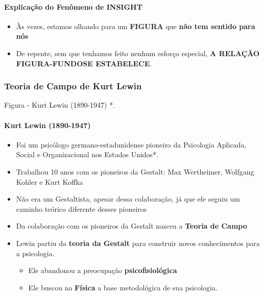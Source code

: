 \documentclass[
]{book}
\providecommand{\tightlist}{%
  \setlength{\itemsep}{0pt}\setlength{\parskip}{0pt}}
\begin{document}
\hypertarget{explicauxe7uxe3o-do-fenuxf4meno-de-insight}{%
\paragraph{Explicação do Fenômeno de
INSIGHT}\label{explicauxe7uxe3o-do-fenuxf4meno-de-insight}}

\begin{itemize}
\tightlist
\item
  Às vezes, estamos olhando para um \textbf{FIGURA} que \textbf{não tem
  sentido para nós}
\item
  De repente, sem que tenhamos feito nenhum esforço especial, \textbf{A
  RELAÇÃO FIGURA-FUNDOSE ESTABELECE}.
\end{itemize}

\hypertarget{teoria-de-campo-de-kurt-lewin}{%
\subsubsection{\texorpdfstring{Teoria de Campo de \textbf{Kurt
Lewin}}{Teoria de Campo de Kurt Lewin}}\label{teoria-de-campo-de-kurt-lewin}}

Figura - Kurt Lewin (1890-1947) *.

\hypertarget{kurt-lewin-1890-1947}{%
\paragraph{Kurt Lewin (1890-1947)}\label{kurt-lewin-1890-1947}}

\begin{itemize}
\tightlist
\item
  Foi um psicólogo germano-estadunidense pioneiro da Psicologia
  Aplicada, Social e Organizacional nos Estados Unidos*.
\item
  Trabalhou 10 anos com os pioneiros da Gestalt: Max Wertheimer,
  Wolfgang Kohler e Kurt Koffka
\item
  Não era um Gestaltista, apesar dessa colaboração, já que ele seguiu um
  caminho teórico diferente desses pioneiros
\item
  Da colaboração com os pioneiros da Gestalt nasceu a \textbf{Teoria de
  Campo}
\item
  Lewin partiu da \textbf{teoria da Gestalt} para construir novos
  conhecimentos para a psicologia.

  \begin{itemize}
  \tightlist
  \item
    Ele abandonou a preocupação \textbf{psicofisiológica}
  \item
    Ele buscou na \textbf{Física} a base metodológica de sua psicologia.
  \end{itemize}
\end{itemize}
\end{document}
